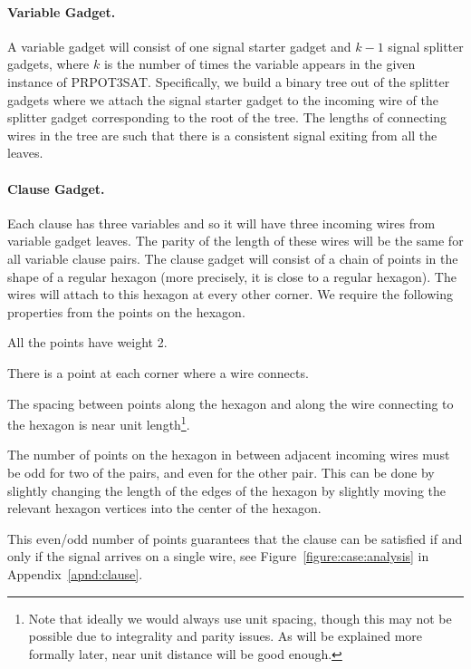 \ifx\STACS\undefined \documentclass[12pt]{article}\else \documentclass[runningheads,a4paper]{llncs}
\newcommand{\PRPOTSAT}{\Term{PRPOT3SAT}\xspace}
\newcommand{\Term}[1]{\textsf{#1}}
\newcommand{\apndref}[1]{Appendix~\ref{apnd:#1}}
\newcommand{\figlab}[1]{\label{figure:#1}}
\newcommand{\figref}[1]{Figure~\ref{figure:#1}}
\begin{document}
\paragraph*{Variable Gadget.}
A variable gadget will consist of one signal starter gadget and $k-1$
signal splitter gadgets, where $k$ is the number of times the variable
appears in the given instance of \PRPOTSAT.  Specifically, we build a
binary tree out of the splitter gadgets where we attach the signal
starter gadget to the incoming wire of the splitter gadget
corresponding to the root of the tree.  The lengths of connecting
wires in the tree are such that there is a consistent signal exiting
from all the leaves.


\vspace{-0.13cm}\parpic[r]{\begin{minipage}{0.3\linewidth}\texttt{[image: figs/clause]}\figlab{variable:2}
   \end{minipage}}
\paragraph*{Clause Gadget.}
Each clause has three variables and so it will have three incoming
wires from variable gadget leaves.  The parity of the length of these
wires will be the same for all variable clause pairs.  The clause
gadget will consist of a chain of points in the shape of a regular
hexagon (more precisely, it is close to a regular hexagon).  The wires
will attach to this hexagon at every other corner.  We require the
following properties from the points on the hexagon.

\begin{compactenum}[\quad(A)]
    \item All the points have weight 2.
    \item There is a point at each corner where a wire connects.
    \item The spacing between points along the hexagon and along the
    wire connecting to the hexagon is near unit length\footnote{Note
    that ideally we would always use unit spacing, though this may not
       be possible due to integrality and parity issues.  As will be
       explained more formally later, near unit distance will be good
       enough.}.

    \item The number of points on the hexagon in between adjacent
    incoming wires must be odd for two of the pairs, and even for the
    other pair. This can be done by slightly changing the length of
    the edges of the hexagon by slightly moving the relevant hexagon
    vertices into the center of the hexagon.

    This even/odd number of points guarantees that the clause can be
    satisfied if and only if the signal arrives on a single wire, see
    \figref{case:analysis} in \apndref{clause}.
\end{compactenum}
\end{document}
